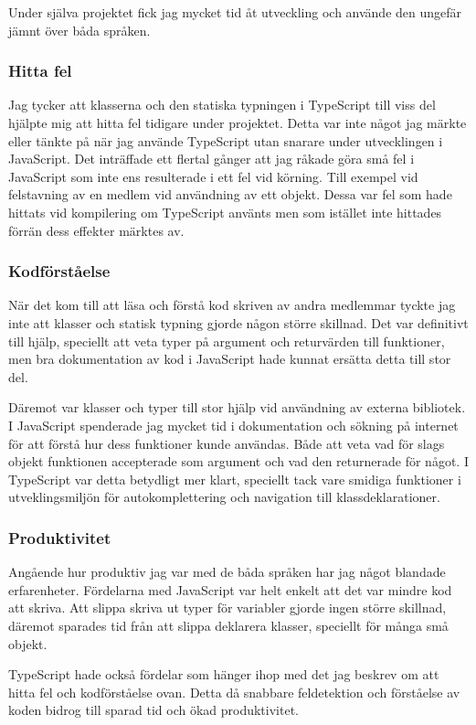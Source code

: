 Under själva projektet fick jag mycket tid åt utveckling och använde den ungefär jämnt över båda språken.
\subsubsection{Hitta fel}
Jag tycker att klasserna och den statiska typningen i TypeScript till viss del hjälpte mig att hitta fel tidigare under projektet. Detta var inte något jag märkte eller tänkte på när jag använde TypeScript utan snarare under utvecklingen i JavaScript. Det inträffade ett flertal gånger att jag råkade göra små fel i JavaScript som inte ens resulterade i ett fel vid körning. Till exempel vid felstavning av en medlem vid användning av ett objekt. Dessa var fel som hade hittats vid kompilering om TypeScript använts men som istället inte hittades förrän dess effekter märktes av.
\subsubsection{Kodförståelse}
När det kom till att läsa och förstå kod skriven av andra medlemmar tyckte jag inte att klasser och statisk typning gjorde någon större skillnad. Det var definitivt till hjälp, speciellt att veta typer på argument och returvärden till funktioner, men bra dokumentation av kod i JavaScript hade kunnat ersätta detta till stor del.

Däremot var klasser och typer till stor hjälp vid användning av externa bibliotek. I JavaScript spenderade jag mycket tid i dokumentation och sökning på internet för att förstå hur dess funktioner kunde användas. Både att veta vad för slags objekt funktionen accepterade som argument och vad den returnerade för något. I TypeScript var detta betydligt mer klart, speciellt tack vare smidiga funktioner i utveklingsmiljön för autokomplettering och navigation till klassdeklarationer.
\subsubsection{Produktivitet}
Angående hur produktiv jag var med de båda språken har jag något blandade erfarenheter. Fördelarna med JavaScript var helt enkelt att det var mindre kod att skriva. Att slippa skriva ut typer för variabler gjorde ingen större skillnad, däremot sparades tid från att slippa deklarera klasser, speciellt för många små objekt.

TypeScript hade också fördelar som hänger ihop med det jag beskrev om att hitta fel och kodförståelse ovan. Detta då snabbare feldetektion och förståelse av koden bidrog till sparad tid och ökad produktivitet. 

